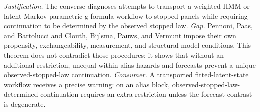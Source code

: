 \documentclass{article}
\begin{document}
\par\smallskip\noindent \textit{Justification.} The converse diagnoses attempts to transport a weighted-HMM or latent-Markov parametric g-formula workflow to stopped panels while requiring continuation to be determined by the observed stopped law. \textit{Gap.} Pennoni, Paas, and Bartolucci and Clouth, Bijlsma, Pauws, and Vermunt impose their own propensity, exchangeability, measurement, and structural-model conditions. This theorem does not contradict those procedures; it shows that without an additional restriction, unequal within-alias hazards and forecasts prevent a unique observed-stopped-law continuation. \textit{Consumer.} A transported fitted-latent-state workflow receives a precise warning: on an alias block, observed-stopped-law-determined continuation requires an extra restriction unless the forecast contrast is degenerate.
\end{document}
